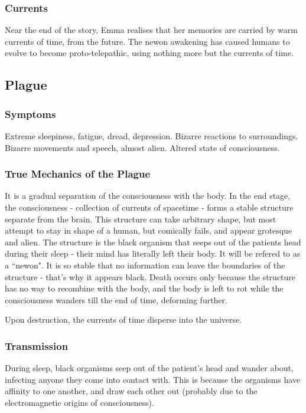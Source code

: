 \documentclass[11pt]{article}
\begin{document}
		\subsubsection{Currents}
		Near the end of the story, Emma realises that her memories are carried by warm currents of time, from the future. 
		The newon awakening has caused humans to evolve to become proto-telepathic, using nothing more but the currents of time.
	\newpage
	
	\subsection{Plague}
		\subsubsection{Symptoms}
		Extreme sleepiness, fatigue, dread, depression.
		Bizarre reactions to surroundings.
		Bizarre movements and speech, almost alien.
		Altered state of consciousness.
		\subsubsection{True Mechanics of the Plague}
		It is a gradual separation of the consciousness with the body. 
		In the end stage, the consciousness - collection of currents of spacetime - forms a stable structure separate from the brain.
		This structure can take arbitrary shape, but most attempt to stay in shape of a human, but comically fails, and appear grotesque and alien.
		The structure is the black organism that seeps out of the patients head during their sleep - their mind has literally left their body. It will be refered to as a ``newon".
		It is so stable that no information can leave the boundaries of the structure - that's why it appears black.
		Death occurs only because the structure has no way to recombine with the body, and the body is left to rot while the consciousness wanders till the end of time, deforming further.
		
		Upon destruction, the currents of time disperse into the universe.
		\subsubsection{Transmission}
		During sleep, black organisms seep out of the patient's head and wander about, infecting anyone they come into contact with.
		This is because the organisms have affinity to one another, and draw each other out (probably due to the electromagnetic origins of consciousness).
\end{document}
